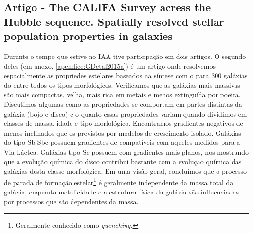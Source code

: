 
\subsection{Artigo - The CALIFA Survey acress the Hubble sequence. Spatially resolved stellar
population properties in galaxies}

Durante o tempo que estive no IAA tive participação em dois artigos. O segundo deles \citep[][GD15
daqui em diante]{GonzalezDelgado.etal.2015a} (em anexo, \ref{apendice:GDetal2015a}) é um artigo
onde resolvemos espacialmente as propriedes estelares baseados na síntese com o \starlight para 300
galáxias do \CAL entre todos os tipos morfológicos. Verificamos que as galáxias mais massivas são
mais compactas, velha, mais rica em metais e menos extinguída por poeira. Discutimos algumas como as
propriedades se comportam em partes distintas da galáxia (bojo e disco) e o quanto essas
propriedades variam quando dividimos em classes de massa, idade e tipo morfológico. Encontramos
gradientes negativos de  menos inclinados que os previstos por modelos de
crescimento isolado. Galáxias do tipo Sb-Sbc possuem gradientes de  compatíveis
com aqueles medidos para a Via Láctea. Galáxias tipo Sc possuem com gradientes mais planos, nos
mostrando que a evolução química do disco contribui bastante com a evolução química das galáxias
desta classe morfológica. Em uma visão geral, concluímos que o processo de parada de formação
estelar\footnote{Geralmente conhecido como {\em quenching}.} é geralmente independente da massa
total da galáxia, enquanto metalicidade e a estrutura física da galáxia são influenciadas por
processos que são dependentes da massa.




